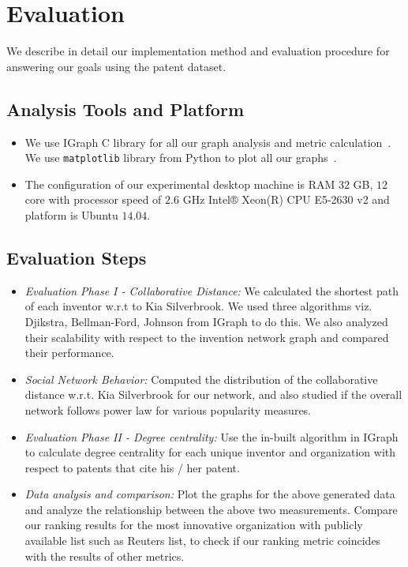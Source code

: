 \section{Evaluation}
\label{sec:eval}


We describe in detail our implementation method and evaluation procedure for
answering  our goals using the patent dataset. 

\subsection{Analysis Tools and Platform}


	\begin{itemize}
		\item We use IGraph C library for all our graph analysis and metric
		calculation~\cite{gephi, igraph}. We use \texttt{matplotlib} library from Python to plot all our graphs~\cite{python}.
		
		\item The configuration of our experimental desktop machine is RAM $32$ GB, $12$
		core with processor speed of $2.6$ GHz Intel® Xeon(R) CPU E5-2630 v2 and platform is Ubuntu $14.04$.
	\end{itemize}



\subsection{Evaluation Steps}
	\begin{itemize}
		\item {\em Evaluation Phase I - Collaborative Distance:} We calculated the 
		shortest path of each inventor w.r.t to Kia Silverbrook. We used three
		algorithms viz. Djikstra, Bellman-Ford, Johnson from IGraph to do this. We
		also analyzed their scalability with respect to the invention network graph
		and compared their performance.
		\item {\em Social Network Behavior:} Computed the distribution of the 
		collaborative distance w.r.t. Kia Silverbrook for our network, and also studied
		if the overall network follows power law for various popularity measures.
		\item {\em Evaluation Phase II - Degree centrality:} Use the in-built
		algorithm in IGraph to calculate degree centrality
		for each unique inventor and organization with respect to patents that cite his / her patent.
		\item {\em Data analysis and comparison:} Plot the graphs for the above
		generated data and analyze the relationship between the above two
		measurements. Compare our ranking results for the most innovative organization
		with publicly available list such as Reuters list, to check if our ranking
		metric coincides with the results of other metrics.
	\end{itemize}



